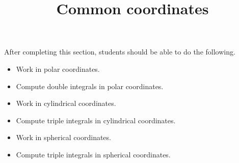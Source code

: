 \documentclass{ximera}
\title{Common coordinates}
\begin{document}
\begin{abstract}
\end{abstract}
\maketitle

\begin{sectionOutcomes}

After completing this section, students should be able to do the following.

\begin{itemize}
\item Work in polar coordinates.
\item Compute double integrals in polar coordinates.
\item Work in cylindrical coordinates.
\item Compute triple integrals in cylindrical coordinates.
\item Work in spherical coordinates.
\item Compute triple integrals in spherical coordinates.
\end{itemize}

\end{sectionOutcomes}
\end{document}
